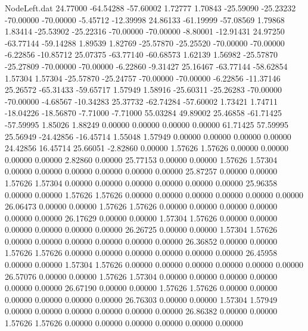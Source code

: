 \begin{filecontents}{NodeLeft.dat}
  24.77000  -64.54288  -57.60002     1.72777    1.70843  -25.59090  -25.23232  -70.00000  -70.00000   -5.45712  -12.39998
  24.86133  -61.19999  -57.08569     1.79868    1.83414  -25.53902  -25.22316  -70.00000  -70.00000   -8.80001  -12.91431
  24.97250  -63.77144  -59.14288     1.89539    1.82769  -25.57870  -25.25520  -70.00000  -70.00000   -6.22856  -10.85712
  25.07375  -63.77140  -60.68573     1.62139    1.56982  -25.57870  -25.27809  -70.00000  -70.00000   -6.22860   -9.31427
  25.16467  -63.77144  -58.62854     1.57304    1.57304  -25.57870  -25.24757  -70.00000  -70.00000   -6.22856  -11.37146
  25.26572  -65.31433  -59.65717     1.57949    1.58916  -25.60311  -25.26283  -70.00000  -70.00000   -4.68567  -10.34283
  25.37732  -62.74284  -57.60002     1.73421    1.74711  -18.04226  -18.56870   -7.71000   -7.71000   55.03284   49.89002
  25.46858  -61.71425  -57.59995     1.85026    1.88249    0.00000    0.00000    0.00000    0.00000   61.71425   57.59995
  25.56949  -24.42856  -16.45714     1.55048    1.57949    0.00000    0.00000    0.00000    0.00000   24.42856   16.45714
  25.66051   -2.82860    0.00000     1.57626    1.57626    0.00000    0.00000    0.00000    0.00000    2.82860    0.00000
  25.77153    0.00000    0.00000     1.57626    1.57304    0.00000    0.00000    0.00000    0.00000    0.00000    0.00000
  25.87257    0.00000    0.00000     1.57626    1.57304    0.00000    0.00000    0.00000    0.00000    0.00000    0.00000
  25.96358    0.00000    0.00000     1.57626    1.57626    0.00000    0.00000    0.00000    0.00000    0.00000    0.00000
  26.06473    0.00000    0.00000     1.57626    1.57626    0.00000    0.00000    0.00000    0.00000    0.00000    0.00000
  26.17629    0.00000    0.00000     1.57304    1.57626    0.00000    0.00000    0.00000    0.00000    0.00000    0.00000
  26.26725    0.00000    0.00000     1.57304    1.57626    0.00000    0.00000    0.00000    0.00000    0.00000    0.00000
  26.36852    0.00000    0.00000     1.57626    1.57626    0.00000    0.00000    0.00000    0.00000    0.00000    0.00000
  26.45958    0.00000    0.00000     1.57304    1.57626    0.00000    0.00000    0.00000    0.00000    0.00000    0.00000
  26.57076    0.00000    0.00000     1.57626    1.57304    0.00000    0.00000    0.00000    0.00000    0.00000    0.00000
  26.67190    0.00000    0.00000     1.57626    1.57626    0.00000    0.00000    0.00000    0.00000    0.00000    0.00000
  26.76303    0.00000    0.00000     1.57304    1.57949    0.00000    0.00000    0.00000    0.00000    0.00000    0.00000
  26.86382    0.00000    0.00000     1.57626    1.57626    0.00000    0.00000    0.00000    0.00000    0.00000    0.00000

\end{filecontents}
